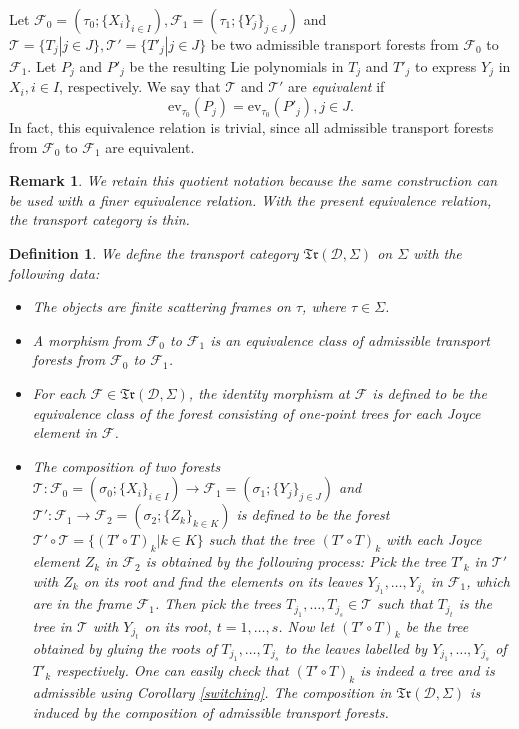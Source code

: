 \documentclass[a4paper,12pt]{amsart}
\numberwithin{equation}{section}
\newtheorem{definition}[theorem]{Definition}
\newtheorem{remark}[theorem]{Remark}
\newcommand{\1}{\mathbf{1}}
\newcommand{\ev}{\mathrm{ev}}
\begin{document}
Let $\mathscr{F}_0=(\tau_0;\{X_i\}_{i\in I}),\mathscr{F}_1=(\tau_1;\{Y_j\}_{j\in J})$ and $\mathscr{T}=\{T_j|j\in J\},\mathscr{T}'=\{T'_j|j\in J\}$ be two admissible transport forests from $\mathscr{F}_0$ to $\mathscr{F}_1$. Let $P_j$ and $P'_j$ be the resulting Lie polynomials in $T_j$ and $T'_j$ to express $Y_j$  in $X_i,i\in I$, respectively. We say that $\mathscr{T}$ and $\mathscr{T}'$ are \emph{equivalent} if
\[\ev_{\tau_0}(P_j)=\ev_{\tau_0}(P'_j),j\in J.\]
In fact, this equivalence relation is trivial, since all admissible transport forests from $\mathscr{F}_0$ to $\mathscr{F}_1$ are equivalent.
\begin{remark}
    We retain this quotient notation because the same construction can be used with a finer equivalence relation. With the present equivalence relation, the transport category is thin.
\end{remark}
\begin{definition}
    We define the \emph{transport category} $\mathfrak{Tr}(\mathcal{D},\Sigma)$ on $\Sigma$ with the following data:
    \begin{itemize}
        \item The objects are finite scattering frames on $\tau$, where $\tau\in\Sigma$.
        \item A morphism from $\mathscr{F}_0$ to $\mathscr{F}_1$ is an equivalence class of admissible transport forests from $\mathscr{F}_0$ to $\mathscr{F}_1$.
        \item For each $\mathscr{F}\in\mathfrak{Tr}(\mathcal{D},\Sigma)$, the identity morphism at $\mathscr{F}$ is defined to be the equivalence class of the forest consisting of one-point trees for each Joyce element in $\mathscr{F}$.
        \item The composition of two forests $\mathscr{T}:\mathscr{F}_0=(\sigma_0;\{X_i\}_{i\in I})\rightarrow\mathscr{F}_1=(\sigma_1;\{Y_j\}_{j\in J})$ and $\mathscr{T}':\mathscr{F}_1\rightarrow\mathscr{F}_2=(\sigma_2;\{Z_k\}_{k\in K})$ is defined to be the forest $\mathscr{T}'\circ\mathscr{T}=\{(T'\circ T)_k|k\in K\}$ such that the tree $(T'\circ T)_k$ with each Joyce element $Z_k$ in $\mathscr{F}_2$ is obtained by the following process: Pick the tree $T'_k$ in $\mathscr{T}'$ with $Z_k$ on its root and find the elements on its leaves $Y_{j_1},\dots,Y_{j_s}$ in $\mathscr{F}_1$, which are in the frame $\mathscr{F}_1$. Then pick the trees $T_{j_1},\dots,T_{j_s}\in\mathscr{T}$ such that $T_{j_t}$ is the tree in $\mathscr{T}$ with $Y_{j_t}$ on its root, $t=1,\dots,s$. Now let $(T'\circ T)_k$ be the tree obtained by gluing the roots of $T_{j_1},\dots,T_{j_s}$ to the leaves labelled by $Y_{j_1},\dots,Y_{j_s}$ of $T'_k$ respectively. One can easily check that $(T'\circ T)_k$ is indeed a tree and is admissible using Corollary \ref{switching}. The composition in $\mathfrak{Tr}(\mathcal{D},\Sigma)$ is induced by the composition of admissible transport forests.
    \end{itemize}
\end{definition}
\end{document}
